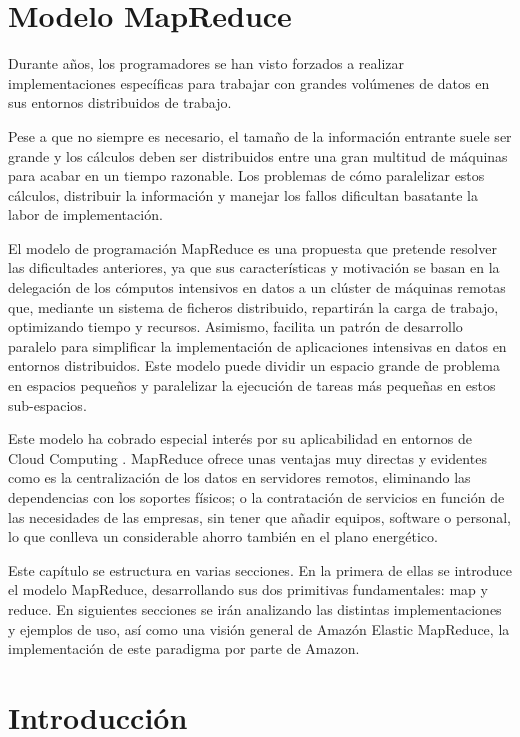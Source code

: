 \documentclass[runningheads]{llncs}
\begin{document}
\section{Modelo MapReduce}


Durante años, los programadores se han visto forzados a realizar implementaciones específicas para trabajar con grandes 
volúmenes de datos en sus entornos distribuidos de trabajo.

Pese a que no siempre es necesario, el tamaño de la información entrante suele ser grande y los cálculos deben ser distribuidos 
entre una gran multitud de máquinas para acabar en un tiempo razonable. Los problemas de cómo paralelizar estos cálculos, 
distribuir la información y manejar los fallos dificultan basatante la labor de implementación. 

El modelo de programación MapReduce es una propuesta que pretende resolver las dificultades anteriores, ya que sus características 
y motivación se basan en la delegación de los cómputos intensivos en datos a un clúster de máquinas remotas que,
mediante un sistema de ficheros distribuido, repartirán la carga de trabajo, optimizando tiempo y recursos. 
Asimismo, facilita un patrón de desarrollo paralelo para simplificar la implementación de aplicaciones intensivas en 
datos en entornos distribuidos. Este modelo puede dividir un espacio grande de problema en espacios pequeños y paralelizar 
la ejecución de tareas más pequeñas en estos sub-espacios. 

Este modelo ha cobrado especial interés por su aplicabilidad en entornos de Cloud Computing \cite{Web08}. 
MapReduce ofrece unas ventajas muy directas y evidentes como es la centralización de los datos en servidores remotos, 
eliminando las dependencias con los soportes físicos; o la contratación de servicios en función de las
necesidades de las empresas, sin tener que añadir equipos, software o personal, lo que conlleva un considerable ahorro 
también en el plano energético. 

Este capítulo se estructura en varias secciones. En la primera de ellas se introduce el modelo MapReduce, desarrollando sus
dos primitivas fundamentales: map y reduce. En siguientes secciones se irán analizando las distintas implementaciones y 
ejemplos de uso, así como una visión general de Amazón Elastic MapReduce, la implementación de este paradigma por parte de
Amazon.

\section{Introducción}
\end{document}
